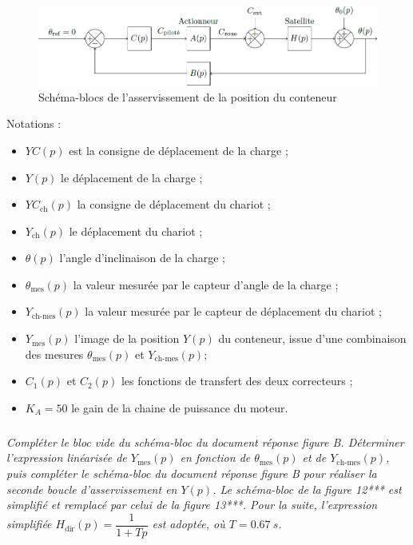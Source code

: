 \documentclass[10pt,fleqn]{article} %
\begin{document}
\begin{figure}[H]
\centering
\includegraphics[width=\linewidth]{images/fig_12}
\caption{Schéma-blocs de l’asservissement de la position du conteneur \label{fig_12}}
\end{figure}

Notations :
\begin{itemize}
\item $Y C(p)$ est la consigne de déplacement de la charge ;
\item $Y (p)$ le déplacement de la charge ;
\item $Y C_{\text{ch}}(p)$ la consigne de déplacement du chariot ;
\item $Y_{\text{ch}}(p)$ le déplacement du chariot ;
\item $\theta(p)$ l’angle d’inclinaison de la charge ;
\item $\theta_{\text{mes}}(p)$ la valeur mesurée par le capteur d’angle de la charge ;
\item $Y_{\text{ch-mes}}(p)$ la valeur mesurée par le capteur de déplacement du chariot ;
\item $Y_{\text{mes}}(p)$ l’image de la position $Y (p)$ du conteneur, issue d’une combinaison des mesures $\theta_{\text{mes}}(p)$ et $Y_{\text{ch-mes}}(p)$;
\item $C_1(p)$ et $C_2(p)$ les fonctions de transfert des deux correcteurs ;
\item $K_A = 50$ le gain de la chaine de puissance du moteur.
\end{itemize}




\subparagraph{\label{q17}}\textit{Compléter le bloc vide du schéma-bloc du document réponse figure B. Déterminer l’expression linéarisée de $Y_{\text{mes}}(p)$ en fonction de $\theta_{\text{mes}}(p)$ et de $Y_{\text{ch-mes}}(p)$, puis compléter le schéma-bloc du document réponse figure B
pour réaliser la seconde boucle d’asservissement en $Y (p)$.
Le schéma-bloc de la figure 12*** est simplifié et remplacé par celui de la figure 13***. Pour la suite, l’expression
simplifiée $H_{\text{dir}}(p) = \dfrac{1}{1+Tp}$ est adoptée, où $T = \SI{0,67}{s}$.}
\end{document}
